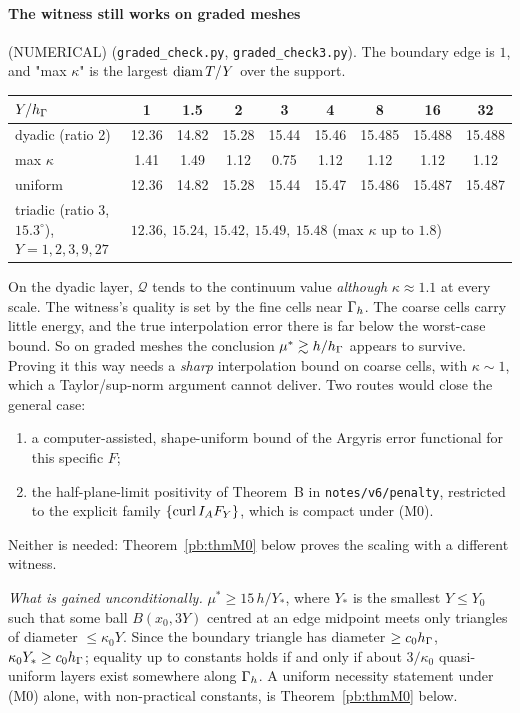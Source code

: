 \paragraph{The witness still works on graded meshes} (NUMERICAL) (\texttt{graded\_check.py},
\texttt{graded\_check3.py}). The boundary edge is $1$, and "max $\kappa$" is the largest $\operatorname{diam} T/Y$ over the support.
\begin{center}\footnotesize\begin{tabular}{lcccccccc}
\toprule
$Y/h_\Gamma$ & 1 & 1.5 & 2 & 3 & 4 & 8 & 16 & 32\\
\midrule
dyadic (ratio 2) & 12.36 & 14.82 & 15.28 & 15.44 & 15.46 & 15.485 & 15.488 & 15.488\\
\quad max $\kappa$ & 1.41 & 1.49 & 1.12 & 0.75 & 1.12 & 1.12 & 1.12 & 1.12\\
uniform & 12.36 & 14.82 & 15.28 & 15.44 & 15.47 & 15.486 & 15.487 & 15.487\\
\midrule
triadic (ratio 3, $15.3^\circ$), $Y=1,2,3,9,27$ & \multicolumn{8}{l}{$12.36,\ 15.24,\ 15.42,\ 15.49,\ 15.48$ (max $\kappa$ up to $1.8$)}\\
\bottomrule
\end{tabular}\end{center}
On the dyadic layer, $\mathcal Q$ tends to the continuum value \emph{although} $\kappa\approx1.1$ at every scale. The
witness's quality is set by the fine cells near $\Gamma_h$. The coarse cells carry little energy, and the true interpolation error
there is far below the worst-case bound. So on graded meshes the conclusion $\mu^\ast\gtrsim h/h_\Gamma$ appears to survive.
Proving it this way needs a \emph{sharp} interpolation bound on coarse cells, with $\kappa\sim1$, which a Taylor/sup-norm
argument cannot deliver. Two routes would close the general case:
\begin{enumerate}[label=(\roman*)]
\item a computer-assisted, shape-uniform bound of the Argyris error functional for this specific $F$;
\item the half-plane-limit positivity of Theorem~B in \texttt{notes/v6/penalty}, restricted to the explicit family
$\{\operatorname{curl} I_AF_Y\}$, which is compact under (M0).
\end{enumerate}
Neither is needed: Theorem~\ref{pb:thmM0} below proves the scaling with a different witness.


\emph{What is gained unconditionally.} $\mu^\ast\ge15\,h/Y_\ast$, where $Y_\ast$ is the smallest $Y\le Y_0$ such that some ball $B(x_0,3Y)$ centred at an edge midpoint meets only triangles of diameter $\le\kappa_0Y$. Since the boundary triangle has diameter $\ge c_0h_\Gamma$, $\kappa_0Y_\ast\ge c_0h_\Gamma$; equality up to constants holds if and only if about $3/\kappa_0$ quasi-uniform layers exist somewhere along $\Gamma_h$. A uniform necessity statement under (M0) alone, with non-practical constants, is Theorem~\ref{pb:thmM0} below.

